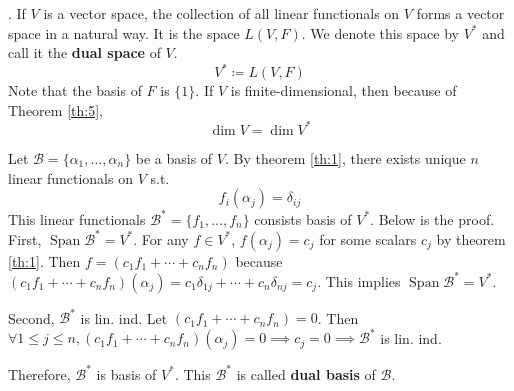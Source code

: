 \documentclass[8pt]{beamer}
\newcommand{\mc}[1]{\mathcal{#1}}
\newcommand{\tb}[1]{\textbf{#1}}
\newcommand{\Span}{\operatorname{Span}}
\begin{document}
\begin{frame}{.}
    If $V$ is a vector space, the collection of all linear functionals on $V$ forms a vector space in a natural way.
    It is the space $L(V,F)$.
    We denote this space by $V^\ast$ and call it the \tb{dual space} of $V$.
    \[
        V^\ast \coloneq L(V,F)
    \]
    Note that the basis of $F$ is $\{1\}$.
    If $V$ is finite-dimensional, then because of Theorem \ref{th:5}, \[\dim V = \dim V^\ast\] 

    \bigskip
    Let $\mc{B} = \{\alpha_1, \dots, \alpha_n\}$ be a basis of $V$.
    By theorem \ref{th:1}, there exists unique $n$ linear functionals on $V$ s.t.
    \[
        f_i (\alpha_j) = \delta_{ij}
    \]
    This linear functionals $\mc{B}^\ast = \{f_1, \dots , f_n\}$ consists basis of $V^\ast$.
    Below is the proof.
    First, $\Span \mc{B^\ast} = V^\ast$.
    For any $f \in V^\ast$, $f(\alpha_j) = c_j$ for some scalars $c_j$ by theorem \ref{th:1}.
    Then $f = (c_1 f_1 + \cdots + c_n f_n)$ because $(c_1 f_1 + \cdots + c_n f_n)(\alpha_j) = c_1 \delta_{1j} + \cdots + c_n \delta_{nj} = c_j$.
    This implies $\Span \mc{B}^\ast = V^\ast$.

    \smallskip
    Second, $\mc{B}^\ast$ is lin. ind.
    Let $(c_1 f_1 + \cdots + c_n f_n) = 0$. Then $\forall 1 \leq j \leq n, (c_1 f_1 + \cdots + c_n f_n)(\alpha_j) = 0 \implies c_j = 0 \implies \mc{B}^\ast$ is lin. ind.

    \smallskip
    Therefore, $\mc{B}^\ast$ is basis of $V^\ast$.
    This $\mc{B}^\ast$ is called \tb{dual basis} of $\mc{B}$.
\end{frame}
\end{document}
